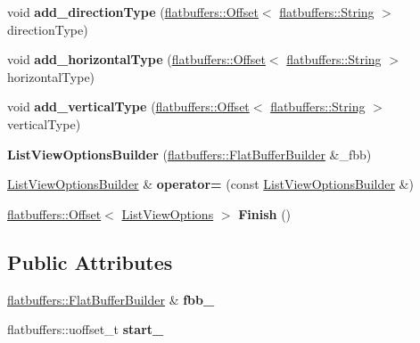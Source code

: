 \begin{DoxyCompactItemize}
void {\bfseries add\+\_\+direction\+Type} (\hyperlink{structflatbuffers_1_1Offset}{flatbuffers\+::\+Offset}$<$ \hyperlink{structflatbuffers_1_1String}{flatbuffers\+::\+String} $>$ direction\+Type)
\item 
\mbox{\label{structflatbuffers_1_1ListViewOptionsBuilder_a9126dde4157833b204c0325d19a43d54}} 
void {\bfseries add\+\_\+horizontal\+Type} (\hyperlink{structflatbuffers_1_1Offset}{flatbuffers\+::\+Offset}$<$ \hyperlink{structflatbuffers_1_1String}{flatbuffers\+::\+String} $>$ horizontal\+Type)
\item 
\mbox{\label{structflatbuffers_1_1ListViewOptionsBuilder_aa30c98d58d475c003374136d5938abc9}} 
void {\bfseries add\+\_\+vertical\+Type} (\hyperlink{structflatbuffers_1_1Offset}{flatbuffers\+::\+Offset}$<$ \hyperlink{structflatbuffers_1_1String}{flatbuffers\+::\+String} $>$ vertical\+Type)
\item 
\mbox{\label{structflatbuffers_1_1ListViewOptionsBuilder_a01344aad28354e50ff0e35d0e7f3578e}} 
{\bfseries List\+View\+Options\+Builder} (\hyperlink{classflatbuffers_1_1FlatBufferBuilder}{flatbuffers\+::\+Flat\+Buffer\+Builder} \&\+\_\+fbb)
\item 
\mbox{\label{structflatbuffers_1_1ListViewOptionsBuilder_a276c215da906f65dab53ee74c1d89bc5}} 
\hyperlink{structflatbuffers_1_1ListViewOptionsBuilder}{List\+View\+Options\+Builder} \& {\bfseries operator=} (const \hyperlink{structflatbuffers_1_1ListViewOptionsBuilder}{List\+View\+Options\+Builder} \&)
\item 
\mbox{\label{structflatbuffers_1_1ListViewOptionsBuilder_ad870b5935b07587d5e2432839a86df17}} 
\hyperlink{structflatbuffers_1_1Offset}{flatbuffers\+::\+Offset}$<$ \hyperlink{structflatbuffers_1_1ListViewOptions}{List\+View\+Options} $>$ {\bfseries Finish} ()
\end{DoxyCompactItemize}
\subsection*{Public Attributes}
\begin{DoxyCompactItemize}
\item 
\mbox{\label{structflatbuffers_1_1ListViewOptionsBuilder_ad18f38ebcadb3c6c6225bc71a2c5cd73}} 
\hyperlink{classflatbuffers_1_1FlatBufferBuilder}{flatbuffers\+::\+Flat\+Buffer\+Builder} \& {\bfseries fbb\+\_\+}
\item 
\mbox{\label{structflatbuffers_1_1ListViewOptionsBuilder_a6e91da24666a3f096ec288785f68624b}} 
flatbuffers\+::uoffset\+\_\+t {\bfseries start\+\_\+}
\end{DoxyCompactItemize}



